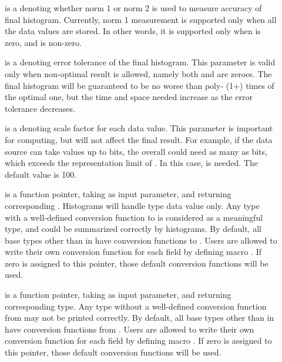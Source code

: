 \begin{description}
\item[] is a  denoting whether norm 1 or norm 2
  is used to measure accuracy of final histogram. Currently, norm 1
  measurement is supported only when all the data values are
  stored. In other words, it is supported only when  is
  zero, and  is non-zero. 

\item[] is a  denoting error tolerance of the
  final histogram. This parameter is valid only when non-optimal
  result is allowed, namely both  and  are
  zeroes. The final histogram will be guaranteed to be no worse than
  poly- (1+) times of the optimal one, but the time and
  space needed increase as the error tolerance decreases.  

\item[] is a  denoting scale factor for
  each data value. This parameter is important for computing, but will
  not affect the final result. For example, if the data source can
  take values up to  bits, the overall  could need
  as many as  bits, which exceeds the representation limit of
  \pads{}. In this case,  is needed. The default value
  is 100.       

\item[] is a function pointer, taking
   as input parameter, and returning corresponding
  . Histograms will handle  type data value 
  only. Any type with a well-defined conversion function to
   is considered as a meaningful type, and could be summarized
  correctly by histograms. By default, all base types other than  in \pads{} have
  conversion functions to . Users are allowed to write their
  own conversion function for each field by defining macro . If zero is assigned to this pointer, those default
  conversion functions will be used.
   
\item[] is a function pointer, taking
   as input parameter, and returning corresponding
   type. Any type without a well-defined conversion
  function from  may not be printed correctly. By
  default, all base types other than  in \pads{} have
  conversion functions from . Users are allowed to write their
  own conversion function for each field by defining macro . If zero is assigned to this pointer, those default
  conversion functions will be used.

\end{description}
